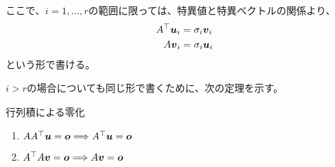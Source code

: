 \documentclass[../../../topic_linear-algebra]{subfiles}
\begin{document}
\br

ここで、$i = 1,\ldots,r$の範囲に限っては、特異値と特異ベクトルの関係より、
\begin{align*}
  A^\top \vb*{u}_i & = \sigma_i \vb*{v}_i \\
  A\vb*{v}_i       & = \sigma_i \vb*{u}_i
\end{align*}
という形で書ける。

$i >r$の場合についても同じ形で書くために、次の定理を示す。

\begin{theorem}{行列積による零化}
  \begin{enumerate}[label=\romanlabel]
    \item $AA^\top \vb*{u} = \vb*{o} \Longrightarrow A^\top \vb*{u} = \vb*{o}$
    \item $A^\top A \vb*{v} = \vb*{o} \Longrightarrow A\vb*{v} = \vb*{o}$
  \end{enumerate}
\end{theorem}
\end{document}
